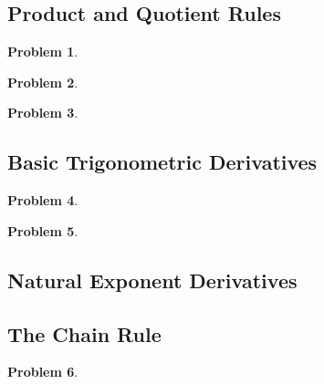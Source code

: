\documentclass{article}
\newtheorem{problem}{Problem}
\begin{document}
\subsection{Product and Quotient Rules}\label{secMPSproductQuotientRules}

\begin{problem}

\end{problem}


\begin{problem}

\end{problem}


\begin{problem}

\end{problem}


\subsection{Basic Trigonometric Derivatives}\label{secMPStrigDerivatives}
\begin{problem}

\end{problem}
\begin{problem}

\end{problem}
\subsection{Natural Exponent Derivatives}


\subsection{The Chain Rule}\label{secMPSchainRule}

\begin{problem}

\end{problem}

\end{document}

